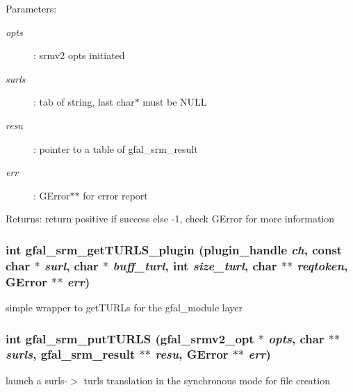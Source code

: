 \begin{Desc}
\item[Parameters:]
\begin{description}
\item[{\em opts}]: srmv2 opts initiated \item[{\em surls}]: tab of string, last char$\ast$ must be NULL \item[{\em resu}]: pointer to a table of gfal\_\-srm\_\-result \item[{\em err}]: GError$\ast$$\ast$ for error report \end{description}
\end{Desc}
\begin{Desc}
\item[Returns:]return positive if success else -1, check GError for more information \end{Desc}
\subsubsection{\setlength{\rightskip}{0pt plus 5cm}int gfal\_\-srm\_\-get\-TURLS\_\-plugin (plugin\_\-handle {\em ch}, const char $\ast$ {\em surl}, char $\ast$ {\em buff\_\-turl}, int {\em size\_\-turl}, char $\ast$$\ast$ {\em reqtoken}, GError $\ast$$\ast$ {\em err})}\label{gfal__common__srm__internal__layer_8h_c85b3f997dc3eeb76f153e01e8c037d5}


simple wrapper to get\-TURLs for the gfal\_\-module layer 
\subsubsection{\setlength{\rightskip}{0pt plus 5cm}int gfal\_\-srm\_\-put\-TURLS (gfal\_\-srmv2\_\-opt $\ast$ {\em opts}, char $\ast$$\ast$ {\em surls}, gfal\_\-srm\_\-result $\ast$$\ast$ {\em resu}, GError $\ast$$\ast$ {\em err})}\label{gfal__common__srm__internal__layer_8h_acba3586236f05c7fd77c17ca9c36504}


launch a surls-$>$ turls translation in the synchronous mode for file creation 

